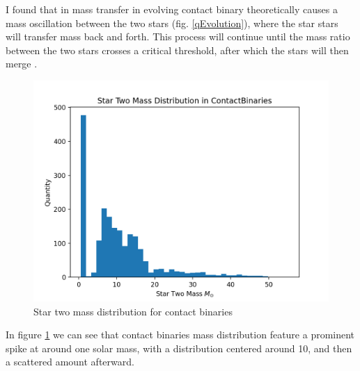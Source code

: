 \documentclass[12pt, a4paper]{article}
\begin{document}
            I found that in mass transfer in evolving contact binary theoretically causes a mass oscillation between the two stars \parencite{Fabry_2025} (fig. \ref{qEvolution}), where the star stars will transfer mass back and forth. This process will continue until the mass ratio between the two stars crosses a critical threshold, after which the stars will then merge \parencite{Fabry_2025}. 

        \begin{figure}[H]
            \centering
            \includegraphics[scale = .4]{figs/GeneratedFigs/W_UMa/ContactBinaries_Star_Two_Mass_Distribution.png}
            \caption{Star two mass distribution for contact binaries}
            \label{contactBinaryStar2MassDistro}
        \end{figure}

        In figure \ref{contactBinaryStar2MassDistro} we can see that contact binaries mass distribution feature a prominent spike at around one solar mass, with a distribution centered around 10, and then a scattered amount afterward. 
\end{document}
